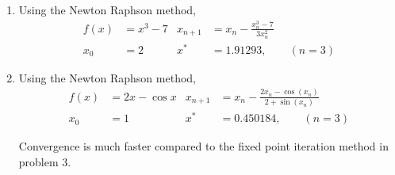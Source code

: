 \begin{enumerate}
    \item Using the Newton Raphson method,
          \begin{align}
              f(x)    & = x^3 - 7                        &
              x_{n+1} & = x_n - \frac{x_n^3 - 7}{3x_n^2}   \\
              x_0     & = 2                              &
              x^*     & = 1.91293,\qquad (n=3)
          \end{align}
          \begin{figure}[H]
              \centering
          \end{figure}

    \item Using the Newton Raphson method,
          \begin{align}
              f(x)    & = 2x - \cos x                                  &
              x_{n+1} & = x_n - \frac{2x_n - \cos(x_n)}{2 + \sin(x_n)}   \\
              x_0     & = 1                                            &
              x^*     & = 0.450184,\qquad (n=3)
          \end{align}
          \begin{figure}[H]
              \centering
          \end{figure}
          Convergence is much faster compared to the fixed point iteration method in
          problem $ 3 $.


\end{enumerate}
